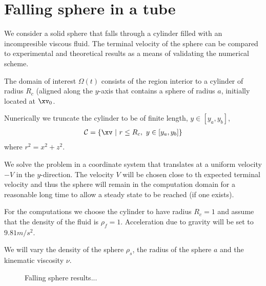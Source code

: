 \section{Falling sphere in a tube} \label{sec:sphereInATube}


We consider a solid sphere that falls through a cylinder filled with an incompresible
viscous fluid. The terminal velocity of the sphere can be compared to experimental
and theoretical results as a means of validating the numerical scheme.

The domain of interest $\Omega(t)$ consists of the region interior to a cylinder of radius $R_c$ (aligned along the
$y$-axis that contains a sphere of radius $a$, initially located at $\xv_0$.

Nunerically we truncate the cylinder to be of finite length, $y\in[y_a,y_b]$,
\begin{align*}
  \Cc = \{ \xv ~\vert~  r\le R_c,~ y\in[y_a,y_b] \}
\end{align*}
where $r^2=x^2+z^2$. 

We solve the problem in a coordinate system that translates at a uniform velocity $-V$ in the $y$-direction.
The velocity $V$ will be chosen close to th expected terminal velocity and thus the sphere will remain
in the computation domain for a reasonable long time to allow a steady state to be reached (if one exists).


For the computations we choose the cylinder to have radius $R_c=1$ and assume that the density
of the fluid is $\rho_f=1$. Acceleration due to gravity will be set to $9.81 m/s^2$. 

We will vary the density of the sphere $\rho_s$, the radius of the sphere $a$ and
the kinematic viscosity $\nu$.




{
\begin{figure}[hbt]
\newcommand{\figWidth}{7.5cm}
\newcommand{\trimfig}[2]{\trimFig{#1}{#2}{0.1}{0.05}{.05}{.05}}
\begin{center}
\end{center}
\caption{Falling sphere results...}
\label{fig:dropSphere}
\end{figure}
}
